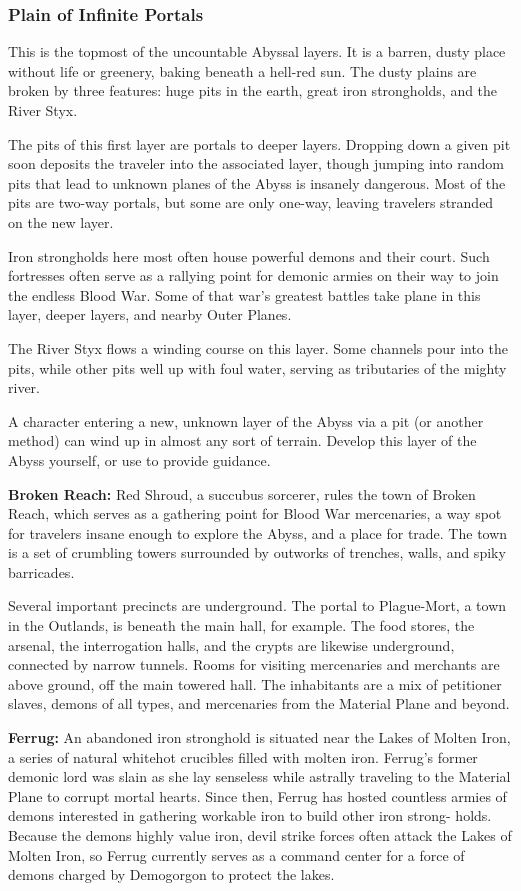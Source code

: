 \subsubsection{Plain of Infinite Portals}
This is the topmost of the uncountable Abyssal layers. It is a barren, dusty place without life or greenery, baking beneath a hell-red sun. The dusty plains are broken by three features: huge pits in the earth, great iron strongholds, and the River Styx.

The pits of this first layer are portals to deeper layers. Dropping down a given pit soon deposits the traveler into the associated layer, though jumping into random pits that lead to unknown planes of the Abyss is insanely dangerous. Most of the pits are two-way portals, but some are only one-way, leaving travelers stranded on the new layer.

Iron strongholds here most often house powerful demons and their court. Such fortresses often serve as a rallying point for demonic armies on their way to join the endless Blood War. Some of that war's greatest battles take plane in this layer, deeper layers, and nearby Outer Planes.

The River Styx flows a winding course on this layer. Some channels pour into the pits, while other pits well up with foul water, serving as tributaries of the mighty river.

A character entering a new, unknown layer of the Abyss via a pit (or another method) can wind up in almost any sort of terrain. Develop this layer of the Abyss yourself, or use  to provide guidance.

\textbf{Broken Reach:} Red Shroud, a succubus sorcerer, rules the town of Broken Reach, which serves as a gathering point for Blood War mercenaries, a way spot for travelers insane enough to explore the Abyss, and a place for trade. The town is a set of crumbling towers surrounded by outworks of trenches, walls, and spiky barricades.

Several important precincts are underground. The portal to Plague-Mort, a town in the Outlands, is beneath the main hall, for example. The food stores, the arsenal, the interrogation halls, and the crypts are likewise underground, connected by narrow tunnels. Rooms for visiting mercenaries and merchants are above ground, off the main towered hall. The inhabitants are a mix of petitioner slaves, demons of all types, and mercenaries from the Material Plane and beyond.

\textbf{Ferrug:} An abandoned iron stronghold is situated near the Lakes of Molten Iron, a series of natural whitehot crucibles filled with molten iron. Ferrug's former demonic lord was slain as she lay senseless while astrally traveling to the Material Plane to corrupt mortal hearts. Since then, Ferrug has hosted countless armies of demons interested in gathering workable iron to build other iron strong- holds. Because the demons highly value iron, devil strike forces often attack the Lakes of Molten Iron, so Ferrug currently serves as a command center for a force of demons charged by Demogorgon to protect the lakes.


